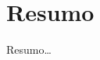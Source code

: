 \begingroup
\let\clearpage\relax
\let\cleardoublepage\relax
\let\cleardoublepage\relax

\chapter*{Resumo}
Resumo\dots





\endgroup			

\vfill
